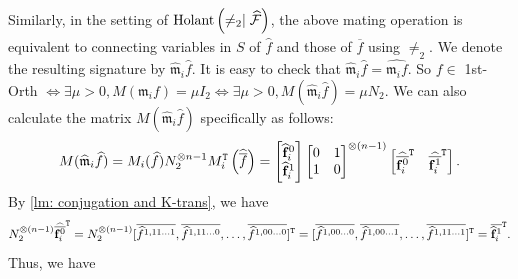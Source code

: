 \iffalse
Similarly, in the setting of $\operatorname{Holant}\left(\neq_2\mid \widehat{\mathcal{F}}\right)$, the above mating operation is equivalent to connecting variables in $S$ of $\widehat{f}$ and those of $\widehat{\overline{f}}$ using $\neq_2$. 
We denote the resulting signature by  $\widehat{\mathfrak{m}}_i\widehat{f}$.
It is easy to check that $\widehat{\mathfrak{m}}_i\widehat{f}=\widehat{{\mathfrak{m}}_i{f}}.$
So $f\in$ {\sc 1st-Orth} $\iff \exists \mu>0,M(\mathfrak m_if)=\mu I_2\iff  \exists \mu>0, M(\widehat{\mathfrak m}_i \widehat{f})= \mu N_2$.
We can also calculate the matrix $M(\widehat{\mathfrak m}_i\widehat{f})$ specifically as follows:
\begin{equation*}
    M(\widehat{\mathfrak{m}}_i\widehat{f})=
    M_{i}(\widehat f)N_2^{\otimes n-1}M^{\tt T}_{i}\left(\widehat{\overline{f}}\right)=
    \left[\begin{matrix}
    \widehat{{\bf f}}_i^0\\
    \widehat{{\bf f}}_i^1
    \end{matrix}\right]
    \left[\begin{matrix}
    0 & 1 \\
     1 & 0
    \end{matrix}\right]^{\otimes (n-1)}
    \left[\begin{matrix}
    {\widehat{\overline{{\bf f}_i^{0}}}}^{\tt T} & {\widehat{\overline{{\bf f}_i^{1}}}^{\tt T}}
    \end{matrix}\right].\\
\end{equation*}
By \cref{lm: conjugation and K-trans},
we have
\begin{equation*}
    N_2^{\otimes (n-1)}{\widehat{\overline{{\bf f}_i^{0}}}^{\tt T}}
    =N_2^{\otimes (n-1)}[\overline{\widehat f^{1,11\ldots1}}, \overline{\widehat f^{1, 11\ldots0}}, \ldots, \overline{\widehat f^{1, 00\ldots0}}]^{\tt T}\\=[\overline{\widehat f^{1,00\ldots0}}, \overline{\widehat f^{1,00\ldots1}}, \ldots, \overline{\widehat f^{1, 11\ldots1}}]^{\tt T}={\overline{\widehat{{\bf f}}_i^{1}}}^{\tt T}.
\end{equation*}
Thus, we have
